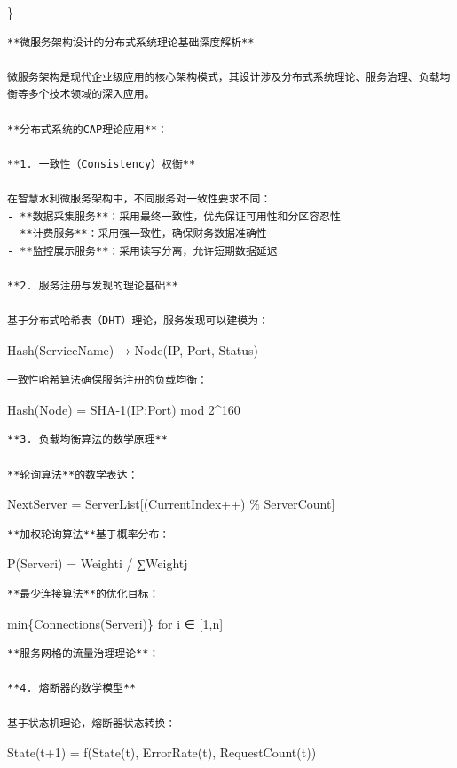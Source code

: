 \}

\begin{lstlisting}
**微服务架构设计的分布式系统理论基础深度解析**

微服务架构是现代企业级应用的核心架构模式，其设计涉及分布式系统理论、服务治理、负载均衡等多个技术领域的深入应用。

**分布式系统的CAP理论应用**：

**1. 一致性（Consistency）权衡**

在智慧水利微服务架构中，不同服务对一致性要求不同：
- **数据采集服务**：采用最终一致性，优先保证可用性和分区容忍性
- **计费服务**：采用强一致性，确保财务数据准确性
- **监控展示服务**：采用读写分离，允许短期数据延迟

**2. 服务注册与发现的理论基础**

基于分布式哈希表（DHT）理论，服务发现可以建模为：
\end{lstlisting}

Hash(ServiceName) → Node(IP, Port, Status)

\begin{lstlisting}
一致性哈希算法确保服务注册的负载均衡：
\end{lstlisting}

Hash(Node) = SHA-1(IP:Port) mod 2\^{}160

\begin{lstlisting}
**3. 负载均衡算法的数学原理**

**轮询算法**的数学表达：
\end{lstlisting}

NextServer = ServerList{[}(CurrentIndex++) \% ServerCount{]}

\begin{lstlisting}
**加权轮询算法**基于概率分布：
\end{lstlisting}

P(Serveri) = Weighti / ∑Weightj

\begin{lstlisting}
**最少连接算法**的优化目标：
\end{lstlisting}

min\{Connections(Serveri)\} for i ∈ {[}1,n{]}

\begin{lstlisting}
**服务网格的流量治理理论**：

**4. 熔断器的数学模型**

基于状态机理论，熔断器状态转换：
\end{lstlisting}

State(t+1) = f(State(t), ErrorRate(t), RequestCount(t))

